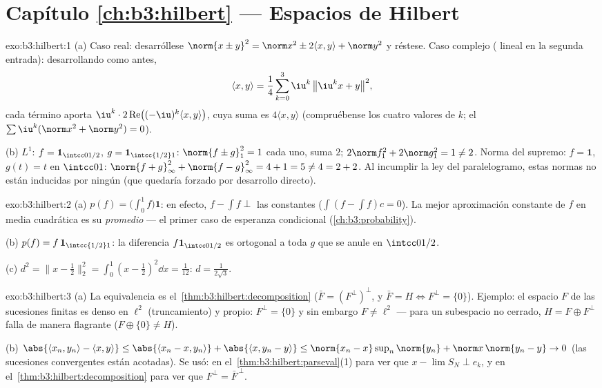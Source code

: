 \section*{Capítulo \ref{ch:b3:hilbert} --- Espacios de Hilbert}

\begin{solution}{exo:b3:hilbert:1}
(a) Caso real: desarróllese $\norm{x \pm y}^2 = \norm x^2 \pm 2\langle
x,y\rangle + \norm y^2$ y réstese. Caso complejo
( lineal en la segunda
entrada): desarrollando como antes,
\[
\langle x, y\rangle = \frac14\sum_{k=0}^{3}
\iu^k\,\bigl\|\iu^kx + y\bigr\|^2,
\]
cada término aporta $\iu^k\cdot2\operatorname{Re}\bigl(
(-\iu)^k\langle x,y\rangle\bigr)$, cuya suma es $4\langle
x,y\rangle$ (compruébense los cuatro valores de $k$; el $\sum\iu^k
(\norm x^2 + \norm y^2) = 0$).

(b) $L^1$: $f = \mathbf 1_{\intcc0{1/2}}$, $g = \mathbf
1_{\intcc{1/2}1}$: $\norm{f\pm g}_1^2 = 1$ cada uno, suma $2$;
$2\norm f_1^2 + 2\norm g_1^2 = 1 \neq 2$. Norma del supremo: $f =
\mathbf 1$, $g(t) = t$ en $\intcc01$: $\norm{f + g}_\infty^2 +
\norm{f-g}_\infty^2 = 4 + 1 = 5 \neq 4 = 2 + 2$. Al incumplir la ley del
paralelogramo, estas normas no están inducidas por ningún
 (que quedaría forzado
por desarrollo directo).
\end{solution}

\begin{solution}{exo:b3:hilbert:2}
(a) $p(f) = \bigl(\int_0^1f\bigr)\mathbf 1$: en efecto, $f - \int f
\perp$ las constantes ($\int(f - \int f)c = 0$). La mejor aproximación
constante de $f$ en media cuadrática es su \emph{promedio} --- el primer
caso de esperanza condicional
(\cref{ch:b3:probability}).

(b) $p(f) = f\,\mathbf 1_{\intcc{1/2}1}$: la diferencia
$f\mathbf 1_{\intcc0{1/2}}$ es ortogonal a toda $g$ que se anule en
$\intcc0{1/2}$.

(c) $d^2 = \bigl\|x - \tfrac12\bigr\|_2^2 = \int_0^1(x -
\tfrac12)^2\dd x = \tfrac1{12}$: $d = \frac1{2\sqrt3}$.
\end{solution}

\begin{solution}{exo:b3:hilbert:3}
(a) La equivalencia es el~\cref{thm:b3:hilbert:decomposition}
($\bar F = (F^\perp)^\perp$, y $\bar F = H \iff F^\perp =
\{0\}$). Ejemplo: el espacio $F$ de las sucesiones finitas es denso en
$\ell^2$ (truncamiento) y propio: $F^\perp = \{0\}$ y sin embargo $F
\neq \ell^2$ --- para un subespacio no cerrado, $H = F \oplus
F^\perp$ falla de manera flagrante ($F \oplus \{0\} \neq H$).

(b) $\abs{\langle x_n, y_n\rangle - \langle x, y\rangle} \leq
\abs{\langle x_n - x, y_n\rangle} + \abs{\langle x, y_n -
y\rangle} \leq \norm{x_n - x}\sup_n\norm{y_n} + \norm
x\,\norm{y_n - y} \to 0$ (las sucesiones convergentes están acotadas).
Se usó: en el~\cref{thm:b3:hilbert:parseval}(1) para ver que $x - \lim
S_N \perp e_k$, y en el~\cref{thm:b3:hilbert:decomposition} para ver que
$F^\perp = \bar F^{\,\perp}$.
\end{solution}

